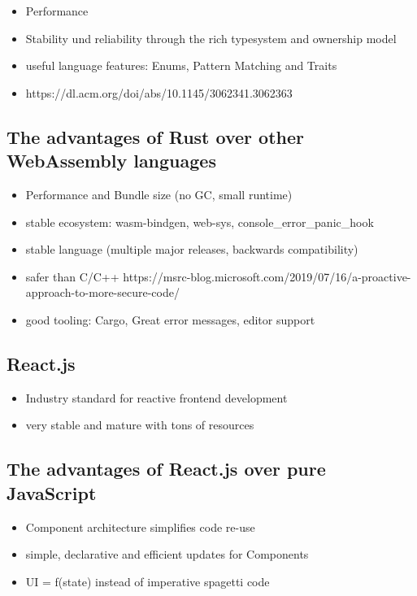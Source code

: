 \begin{itemize}
  \item Performance
  \item Stability und reliability through the rich typesystem and ownership model
  \item useful language features: Enums, Pattern Matching and Traits
  \item https://dl.acm.org/doi/abs/10.1145/3062341.3062363
\end{itemize}

\subsection{The advantages of Rust over other WebAssembly languages}

\begin{itemize}
  \item Performance and Bundle size (no GC, small runtime)
  \item stable ecosystem: wasm-bindgen, web-sys, console\_error\_panic\_hook
  \item stable language (multiple major releases, backwards compatibility)
  \item safer than C/C++ https://msrc-blog.microsoft.com/2019/07/16/a-proactive-approach-to-more-secure-code/
  \item good tooling: Cargo, Great error messages, editor support
\end{itemize}

\subsection{React.js}

\begin{itemize}
  \item Industry standard for reactive frontend development
  \item very stable and mature with tons of resources
\end{itemize}

\subsection{The advantages of React.js over pure JavaScript}

\begin{itemize}
  \item Component architecture simplifies code re-use
  \item simple, declarative and efficient updates for Components
  \item UI = f(state) instead of imperative spagetti code
\end{itemize}
